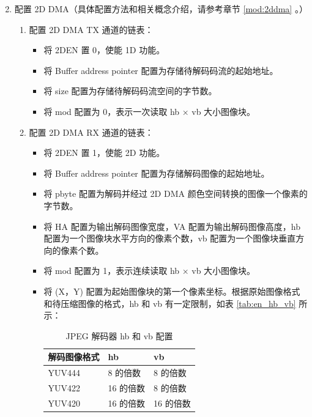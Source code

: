 \documentclass[main\_\_CN.tex]{subfiles}
\begin{document}
\begin{enumerate}
\begin{itemize}
\begin{itemize}
{\begin{longtable}{ | L{4cm} | L{4cm} | l | l |}
                    \end{longtable}
                }
        \end{itemize}
    \end{itemize}
    \item 配置 2D DMA（具体配置方法和相关概念介绍，请参考章节 \ref{mod:2ddma}
    \textit{}。）
    \begin{enumerate}
        \item 配置 2D DMA TX 通道的链表：
        \begin{itemize}
            \item 将 2DEN 置 0，使能 1D 功能。
            \item 将 Buffer address pointer 配置为存储待解码码流的起始地址。
            \item 将 size 配置为存储待解码码流空间的字节数。
            \item 将 mod 配置为 0，表示一次读取 hb × vb 大小图像块。
        \end{itemize}
        \item 配置 2D DMA RX 通道的链表：
        \begin{itemize}
            \item 将 2DEN 置 1，使能 2D 功能。
            \item 将 Buffer address pointer 配置为存储解码图像的起始地址。
            \item 将 pbyte 配置为解码并经过 2D DMA 颜色空间转换的图像一个像素的字节数。
            \item 将 HA 配置为输出解码图像宽度，VA 配置为输出解码图像高度，hb 配置为一个图像块水平方向的像素个数，vb 配置为一个图像块垂直方向的像素个数。
            \item 将 mod 配置为 1，表示连续读取 hb × vb 大小图像块。
            \item 将 (X，Y) 配置为起始图像块的第一个像素坐标。根据原始图像格式和待压缩图像的格式，hb 和 vb 有一定限制，如表 \ref{tab:en_hb_vb} 所示：
        \begin{longtable}{ | L{4cm} | L{3cm} | L{3cm} | }
        \caption{JPEG 解码器 hb 和 vb 配置} \label{tab:de_hb_vb}
        \\ \hline
        \textbf{解码图像格式}  &  \textbf{hb}  &  \textbf{vb}\\ \hline
        YUV444 &  8 的倍数 &  8 的倍数  \\ \hline
        YUV422 &  16 的倍数 &  8 的倍数  \\ \hline
        YUV420 &  16 的倍数 &  16 的倍数  \\ \hline

\end{longtable}
\end{itemize}
\end{enumerate}
\end{enumerate}
\end{document}
